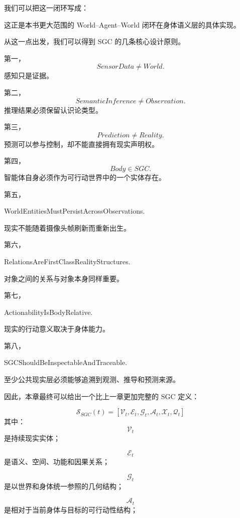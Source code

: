 我们可以把这一闭环写成：
\begin{statementbox}
\centering
{}
\end{statementbox}

这正是本书更大范围的 World--Agent--World 闭环在身体语义层的具体实现。

从这一点出发，我们可以得到 SGC 的几条核心设计原则。

第一，
\[
\boxed{
SensorData
\neq
World.
}
\]
感知只是证据。

第二，
\[
\boxed{
SemanticInference
\neq
Observation.
}
\]
推理结果必须保留认识论类型。

第三，
\[
\boxed{
Prediction
\neq
Reality.
}
\]
预测可以参与控制，却不能直接拥有现实声明权。

第四，
\[
\boxed{
Body\in SGC.
}
\]
智能体自身必须作为可行动世界中的一个实体存在。

第五，
\begin{statementbox}
WorldEntitiesMustPersistAcrossObservations.
\end{statementbox}
现实不能随着摄像头帧刷新而重新出生。

第六，
\begin{statementbox}
RelationsAreFirstClassRealityStructures.
\end{statementbox}
对象之间的关系与对象本身同样重要。

第七，
\begin{statementbox}
ActionabilityIsBodyRelative.
\end{statementbox}
现实的行动意义取决于身体能力。

第八，
\begin{statementbox}
SGCShouldBeInspectableAndTraceable.
\end{statementbox}
至少公共现实层必须能够追溯到观测、推导和预测来源。

因此，本章最终可以给出一个比上一章更加完整的 SGC 定义：

\[
\boxed{
\mathcal S_{SGC}(t)
=
\left[
\mathcal V_t,
\mathcal E_t,
\mathcal G_t,
\mathcal A_t,
\mathcal X_t,
\mathcal Q_t
\right]
}
\]
其中：
\[
\mathcal V_t
\]
是持续现实实体；

\[
\mathcal E_t
\]
是语义、空间、功能和因果关系；

\[
\mathcal G_t
\]
是以世界和身体统一参照的几何结构；

\[
\mathcal A_t
\]
是相对于当前身体与目标的可行动性结构；

